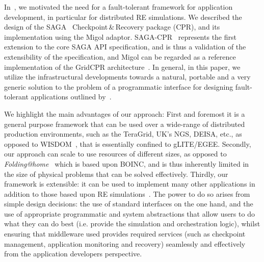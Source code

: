 \documentclass{rspublic}
\newcommand{\alnote}[1]{ {\textcolor{blue} { ***AL: #1 }}}
\newcommand{\amnote}[1]{ {\textcolor{magenta} { ***AM: #1 }}}
\newcommand{\jhanote}[1]{ {\textcolor{red} { ***SJ: #1 }}}
\newcommand{\alnote}[1]{}
\newcommand{\amnote}[1]{}
\newcommand{\jhanote}[1]{}
\begin{document}

In~\citet{Luckow:2008la}, we motivated the need for a
fault-tolerant framework for application development, in particular
for distributed RE simulations.  We described the design of the
SAGA~\citep{saga_gfd90} Checkpoint\,\&\,Recovery package (CPR), and
its implementation using the Migol adaptor. SAGA-CPR~\citep{saga-cpr}
represents the first extension to the core SAGA API specification, and
is thus a validation of the extensibility of the specification, and
Migol can be regarded as a reference implementation of the GridCPR
architecture~\citep{ogf_cpr_arch}. In general, in this paper, we
utilize the infrastructural developments towards a natural, portable
and a very generic solution to the problem of a programmatic interface
for designing fault-tolerant applications outlined by~\citet{Luckow:2008la}.


We highlight the main advantages of our approach: First and foremost
it is a general purpose framework that can be used over a wide-range
of distributed production environments, such as the TeraGrid, UK's
NGS, DEISA, etc., as opposed to WISDOM~\citep{wisdom}, that is
essentially confined to gLITE/EGEE. Secondly, our approach can scale
to use resources of different sizes, as opposed to {\it
  Folding@home}~\citep{folding} which is based upon BOINC, and is thus
inherently limited in the size of physical problems that can be solved
effectively.  Thirdly, our framework is extensible: it can be used to
implement many other applications in addition to those based upon RE
simulations~\citep{escience07}. The power to do so arises from simple
design decisions: the use of standard interfaces on the one hand, and
the use of appropriate programmatic and system abstractions that allow
users to do what they can do best (i.e. provide the simulation and
orchestration logic), whilst ensuring that middleware used provides
required services (such as checkpoint management, application
monitoring and recovery) seamlessly and effectively from the
application developers perspective.
\end{document}
